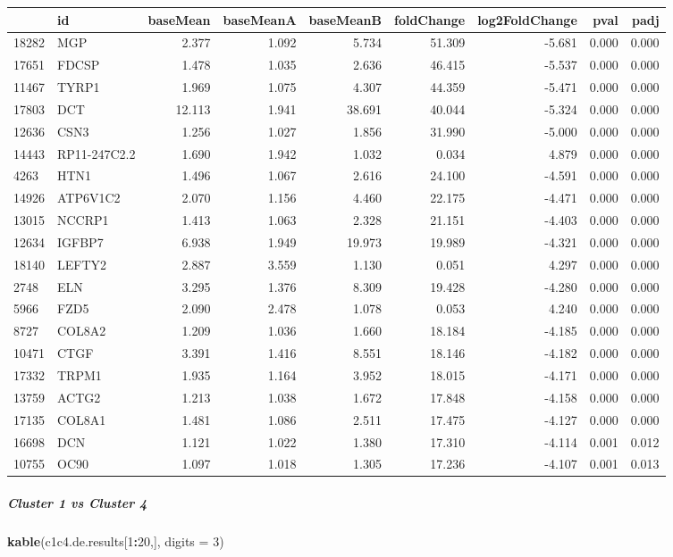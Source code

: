 \documentclass[]{article}
\newenvironment{Shaded}{\begin{snugshade}}{\end{snugshade}}
\newcommand{\DataTypeTok}[1]{\textcolor[rgb]{0.13,0.29,0.53}{#1}}
\newcommand{\DecValTok}[1]{\textcolor[rgb]{0.00,0.00,0.81}{#1}}
\newcommand{\KeywordTok}[1]{\textcolor[rgb]{0.13,0.29,0.53}{\textbf{#1}}}
\newcommand{\NormalTok}[1]{#1}
\newcommand{\OperatorTok}[1]{\textcolor[rgb]{0.81,0.36,0.00}{\textbf{#1}}}
\let\oldsubparagraph\subparagraph
\renewcommand{\subparagraph}[1]{\oldsubparagraph{#1}\mbox{}}
\begin{document}
\begin{longtable}[]{@{}llrrrrrrr@{}}
\toprule
& id & baseMean & baseMeanA & baseMeanB & foldChange & log2FoldChange &
pval & padj\tabularnewline
\midrule
\endhead
18282 & MGP & 2.377 & 1.092 & 5.734 & 51.309 & -5.681 & 0.000 &
0.000\tabularnewline
17651 & FDCSP & 1.478 & 1.035 & 2.636 & 46.415 & -5.537 & 0.000 &
0.000\tabularnewline
11467 & TYRP1 & 1.969 & 1.075 & 4.307 & 44.359 & -5.471 & 0.000 &
0.000\tabularnewline
17803 & DCT & 12.113 & 1.941 & 38.691 & 40.044 & -5.324 & 0.000 &
0.000\tabularnewline
12636 & CSN3 & 1.256 & 1.027 & 1.856 & 31.990 & -5.000 & 0.000 &
0.000\tabularnewline
14443 & RP11-247C2.2 & 1.690 & 1.942 & 1.032 & 0.034 & 4.879 & 0.000 &
0.000\tabularnewline
4263 & HTN1 & 1.496 & 1.067 & 2.616 & 24.100 & -4.591 & 0.000 &
0.000\tabularnewline
14926 & ATP6V1C2 & 2.070 & 1.156 & 4.460 & 22.175 & -4.471 & 0.000 &
0.000\tabularnewline
13015 & NCCRP1 & 1.413 & 1.063 & 2.328 & 21.151 & -4.403 & 0.000 &
0.000\tabularnewline
12634 & IGFBP7 & 6.938 & 1.949 & 19.973 & 19.989 & -4.321 & 0.000 &
0.000\tabularnewline
18140 & LEFTY2 & 2.887 & 3.559 & 1.130 & 0.051 & 4.297 & 0.000 &
0.000\tabularnewline
2748 & ELN & 3.295 & 1.376 & 8.309 & 19.428 & -4.280 & 0.000 &
0.000\tabularnewline
5966 & FZD5 & 2.090 & 2.478 & 1.078 & 0.053 & 4.240 & 0.000 &
0.000\tabularnewline
8727 & COL8A2 & 1.209 & 1.036 & 1.660 & 18.184 & -4.185 & 0.000 &
0.000\tabularnewline
10471 & CTGF & 3.391 & 1.416 & 8.551 & 18.146 & -4.182 & 0.000 &
0.000\tabularnewline
17332 & TRPM1 & 1.935 & 1.164 & 3.952 & 18.015 & -4.171 & 0.000 &
0.000\tabularnewline
13759 & ACTG2 & 1.213 & 1.038 & 1.672 & 17.848 & -4.158 & 0.000 &
0.000\tabularnewline
17135 & COL8A1 & 1.481 & 1.086 & 2.511 & 17.475 & -4.127 & 0.000 &
0.000\tabularnewline
16698 & DCN & 1.121 & 1.022 & 1.380 & 17.310 & -4.114 & 0.001 &
0.012\tabularnewline
10755 & OC90 & 1.097 & 1.018 & 1.305 & 17.236 & -4.107 & 0.001 &
0.013\tabularnewline
\bottomrule
\end{longtable}

\hypertarget{cluster-1-vs-cluster-4}{%
\subparagraph{Cluster 1 vs Cluster 4}\label{cluster-1-vs-cluster-4}}

\begin{Shaded}
\begin{Highlighting}[]
\KeywordTok{kable}\NormalTok{(c1c4.de.results[}\DecValTok{1}\OperatorTok{:}\DecValTok{20}\NormalTok{,], }\DataTypeTok{digits =} \DecValTok{3}\NormalTok{)}
\end{Highlighting}
\end{Shaded}
\end{document}
